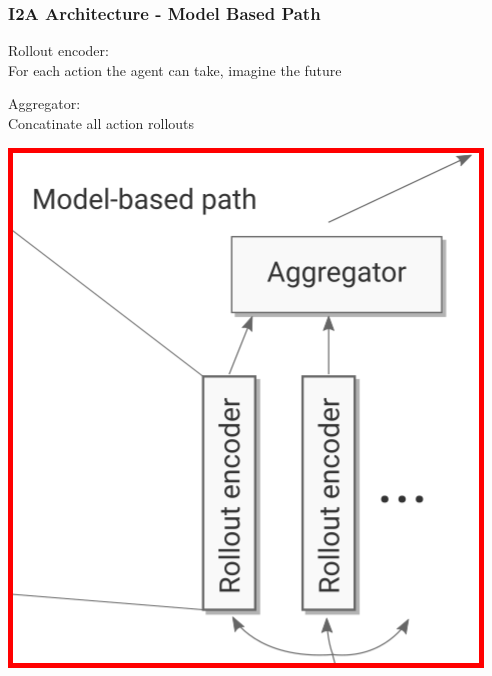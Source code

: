 \begin{frame}
    \frametitle{I2A Architecture - Model Based Path}

\begin{multicols}{2}
	\begin{PraesentationAufzaehlung}
	    \item Rollout encoder:\\
		For each action the agent can take, 
		imagine the future%
		\item Aggregator: \\
		Concatinate all action rollouts
	\end{PraesentationAufzaehlung}
    \vfill\columnbreak
	\begin{center}
    \includegraphics[height=.5\textheight]{./Images/i2a_model_based.png}%
	\end{center}
\end{multicols}
    
\end{frame}
\clearpage



